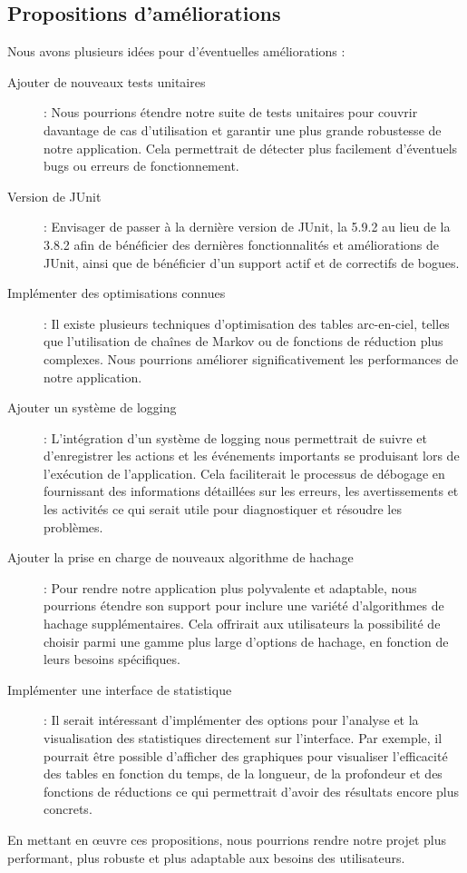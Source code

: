 \documentclass[a4paper,12pt]{article}
\begin{document}
\subsection{Propositions d’améliorations}
Nous avons plusieurs idées pour d'éventuelles améliorations :
\begin{description}
    \item [Ajouter de nouveaux tests unitaires] : Nous pourrions étendre notre suite de tests unitaires pour couvrir davantage de cas d'utilisation et garantir une plus grande robustesse de notre application. Cela permettrait de détecter plus facilement d'éventuels bugs ou erreurs de fonctionnement.
    \item [Version de JUnit] : Envisager de passer à la dernière version de JUnit, la 5.9.2 au lieu de la 3.8.2 afin de bénéficier des dernières fonctionnalités et améliorations de JUnit, ainsi que de bénéficier d’un support actif et de correctifs de bogues.
    \item [Implémenter des optimisations connues] : Il existe plusieurs techniques d'optimisation des tables arc-en-ciel, telles que l'utilisation de chaînes de Markov ou de fonctions de réduction plus complexes. Nous pourrions améliorer significativement les performances de notre application.
    \item [Ajouter un système de logging] : L'intégration d'un système de logging nous permettrait de suivre et d'enregistrer les actions et les événements importants se produisant lors de l'exécution de l'application. Cela faciliterait le processus de débogage en fournissant des informations détaillées sur les erreurs, les avertissements et les activités ce qui serait utile pour diagnostiquer et résoudre les problèmes.
    \item [Ajouter la prise en charge de nouveaux algorithme de hachage] : Pour rendre notre application plus polyvalente et adaptable, nous pourrions étendre son support pour inclure une variété d'algorithmes de hachage supplémentaires. Cela offrirait aux utilisateurs la possibilité de choisir parmi une gamme plus large d'options de hachage, en fonction de leurs besoins spécifiques.
    \item [Implémenter une interface de statistique] : Il serait intéressant d’implémenter des options pour l’analyse et la visualisation des statistiques directement sur l'interface. Par exemple, il pourrait être possible d’afficher des graphiques pour visualiser l’efficacité des tables en fonction du temps, de la longueur, de la profondeur et des fonctions de réductions ce qui permettrait d’avoir des résultats encore plus concrets.
\end{description}
En mettant en œuvre ces propositions, nous pourrions rendre notre projet plus performant, plus robuste et plus adaptable aux besoins des utilisateurs.
\end{document}
